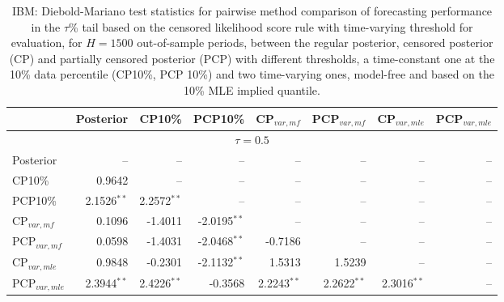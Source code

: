 { \renewcommand{\arraystretch}{1.2} 
 {\footnotesize 
\begin{table} 
\center 
\begin{tabular}{l | rrrrrrr} 
& \multicolumn{1}{c}{Posterior}& \multicolumn{1}{c}{CP10\%}& \multicolumn{1}{c}{PCP10\%}& \multicolumn{1}{c}{CP$_{var,mf}$}& \multicolumn{1}{c}{PCP$_{var,mf}$}& \multicolumn{1}{c}{CP$_{var,mle}$}& \multicolumn{1}{c}{PCP$_{var,mle}$} \\ \hline 
\multicolumn{8}{c}{$\tau = 0.5$} \\ \hline 
Posterior &    --\phantom{$^{***}$} &    --\phantom{$^{***}$} &    --\phantom{$^{***}$} &    --\phantom{$^{***}$} &    --\phantom{$^{***}$} &    --\phantom{$^{***}$} &    --\phantom{$^{***}$}   \\ 
CP10\% & 0.9642\phantom{$^{***}$} &    --\phantom{$^{***}$} &    --\phantom{$^{***}$} &    --\phantom{$^{***}$} &    --\phantom{$^{***}$} &    --\phantom{$^{***}$} &    --\phantom{$^{***}$}   \\ 
PCP10\% & 2.1526$^{**}$\phantom{$^{*}$} & 2.2572$^{**}$\phantom{$^{*}$} &    --\phantom{$^{***}$} &    --\phantom{$^{***}$} &    --\phantom{$^{***}$} &    --\phantom{$^{***}$} &    --\phantom{$^{***}$}   \\ 
CP$_{var,mf}$ & 0.1096\phantom{$^{***}$} & -1.4011\phantom{$^{***}$} & -2.0195$^{**}$\phantom{$^{*}$} &    --\phantom{$^{***}$} &    --\phantom{$^{***}$} &    --\phantom{$^{***}$} &    --\phantom{$^{***}$}   \\ 
PCP$_{var,mf}$ & 0.0598\phantom{$^{***}$} & -1.4031\phantom{$^{***}$} & -2.0468$^{**}$\phantom{$^{*}$} & -0.7186\phantom{$^{***}$} &    --\phantom{$^{***}$} &    --\phantom{$^{***}$} &    --\phantom{$^{***}$}   \\ 
CP$_{var,mle}$ & 0.9848\phantom{$^{***}$} & -0.2301\phantom{$^{***}$} & -2.1132$^{**}$\phantom{$^{*}$} & 1.5313\phantom{$^{***}$} & 1.5239\phantom{$^{***}$} &    --\phantom{$^{***}$} &    --\phantom{$^{***}$}   \\ 
PCP$_{var,mle}$ & 2.3944$^{**}$\phantom{$^{*}$} & 2.4226$^{**}$\phantom{$^{*}$} & -0.3568\phantom{$^{***}$} & 2.2243$^{**}$\phantom{$^{*}$} & 2.2622$^{**}$\phantom{$^{*}$} & 2.3016$^{**}$\phantom{$^{*}$} &    --\phantom{$^{***}$}   \\ 
\hline 
\end{tabular}
 \caption{IBM: Diebold-Mariano test statistics for pairwise method comparison  of forecasting performance in the $\tau$\% tail based on  the censored likelihood score rule with  time-varying  threshold for evaluation,  for $H=1500$ out-of-sample periods,  between  the regular posterior, censored posterior (CP) and  partially censored posterior (PCP) with different thresholds,  a time-constant one at the 10\% data percentile (CP10\%, PCP 10\%) and two time-varying ones, model-free and based on the 10\% MLE implied quantile. }
\label{tab:IBM_DMv_0.5}  
\end{table}
}}